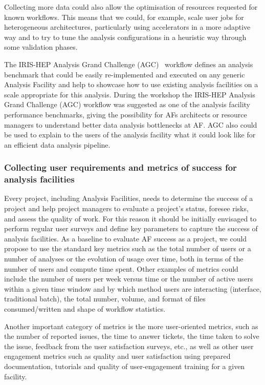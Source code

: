 \documentclass[a4paper,11pt]{article}
\begin{document}
Collecting more data could also allow the optimisation of resources
requested for known workflows. This means that we could, for example,
scale user jobs for heterogeneous architectures, particularly using
accelerators in a more adaptive way and to try to tune the analysis
configurations in a heuristic way through some validation phases.

The IRIS-HEP Analysis Grand Challenge (AGC)~\cite{agc} workflow defines an analysis
benchmark that could be easily re-implemented and executed on any
generic Analysis Facility and help to showcase how to use existing
analysis facilities on a scale appropriate for this analysis. During the
workshop the IRIS-HEP Analysis Grand Challenge (AGC) workflow was
suggested as one of the analysis facility performance benchmarks, giving
the possibility for AFs architects or resource managers to understand
better data analysis bottlenecks at AF. AGC also could be used to
explain to the users of the analysis facility what it could look like
for an efficient data analysis pipeline.

\hypertarget{collecting-user-requirements-and-metrics-of-success-for-analysis-facilities}{%
\subsubsection{Collecting user requirements and metrics of success for
analysis
facilities}\label{collecting-user-requirements-and-metrics-of-success-for-analysis-facilities}}

Every project, including Analysis Facilities, needs to determine
the success of a project and help project managers to evaluate a project's
status, foresee risks, and assess the quality of work. For this reason it
should be initially envisaged to perform regular user surveys and define
key parameters to capture the success of analysis facilities. As a
baseline to evaluate AF success as a project, we could propose to use
the standard key metrics such as the total number of users or a number of
analyses or the evolution of usage over time, both in terms of the number of
users and compute time spent. Other examples of metrics could include
the number of users per week versus time or the number of active users
within a given time window and by which method users are interacting
(interface, traditional batch), the total number, volume, and format of
files consumed/written and shape of workflow statistics.

Another important category of metrics is the more user-oriented
metrics, such as the number of reported issues, the time to answer
tickets, the time taken to solve the issue, feedback from the user
satisfaction surveys, etc., as well as other user engagement metrics
such as quality and user satisfaction using prepared documentation,
tutorials and quality of user-engagement training for a given facility.
\end{document}
